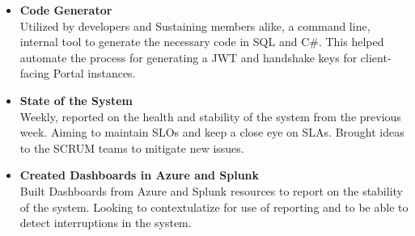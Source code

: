 \documentclass[a4paper]{mctemplate} %
\begin{document}
\begin{main}
\begin{itemize}
    \item \textbf{Code Generator}
    \hfill \\
    \newline
    Utilized by developers and Sustaining members alike, a command line, internal tool to generate the necessary code in SQL and C\#. This helped automate the process for generating a JWT and handshake keys for client-facing Portal instances.
     
    
    \item \textbf{State of the System}
    \hfill \\
    \newline
    Weekly, reported on the health and stability of the system from the previous week. Aiming to maintain SLOs and keep a close eye on SLAs. Brought ideas to the SCRUM teams to mitigate new issues.
    
    \item \textbf{Created Dashboards in Azure and Splunk}
    \hfill \\
    \newline
    {Built Dashboards from Azure and Splunk resources to report on the stability of the system. Looking to contextulatize for use of reporting and to be able to detect interruptions in the system.
    }

    \vspace{.3cm}
\end{itemize}

\end{main}
\end{document}
